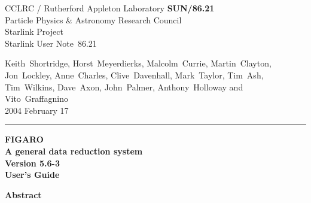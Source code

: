 \documentclass[11pt,twoside]{article}
\newcommand{\Figaroversion}{5.6-3~}
\newcommand{\stardoccategory}  {Starlink User Note}
\newcommand{\stardocinitials}  {SUN}
\newcommand{\stardocnumber}    {86.21}
\newcommand{\stardocauthors}   {Keith~Shortridge, Horst~Meyerdierks,
                                Malcolm~Currie, Martin~Clayton, Jon~Lockley,
                                Anne~Charles, Clive~Davenhall,
                                Mark~Taylor, Tim~Ash, Tim~Wilkins, Dave~Axon,
                                John~Palmer, Anthony~Holloway and
                                Vito~Graffagnino}
\newcommand{\stardocdate}      {2004 February 17}
\newcommand{\stardoctitle}     {FIGARO \\ [1ex] A general data reduction system}
\newcommand{\stardocversion}   {Version \Figaroversion}
\newcommand{\stardocmanual}    {User's Guide}
\newcommand{\stardocname}{\stardocinitials /\stardocnumber}
\newenvironment{latexonly}{}{}
\begin{document}
\thispagestyle{empty}

\begin{latexonly}
   CCLRC / {\sc Rutherford Appleton Laboratory} \hfill {\bf \stardocname}\\
   {\large Particle Physics \& Astronomy Research Council}\\
   {\large Starlink Project\\}
   {\large \stardoccategory\ \stardocnumber}
   \begin{flushright}
   \stardocauthors\\
   \stardocdate
   \end{flushright}
   \vspace{-4mm}
   \rule{\textwidth}{0.5mm}
   \vspace{5mm}
   \begin{center}
   {\Huge\bf  \stardoctitle \\ [2.5ex]}
   {\LARGE\bf \stardocversion \\ [4ex]}
   {\Huge\bf  \stardocmanual}
   \end{center}
   \vspace{5mm}

   \vspace{10mm}
   \begin{center}
      {\Large\bf Abstract}
   \end{center}
\end{latexonly}
\end{document}
